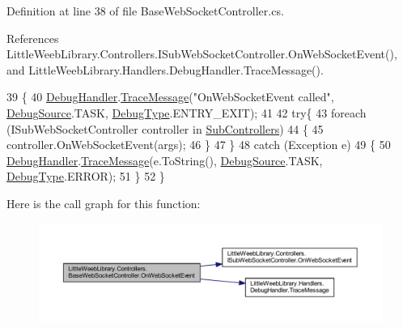 Definition at line 38 of file Base\+Web\+Socket\+Controller.\+cs.



References Little\+Weeb\+Library.\+Controllers.\+I\+Sub\+Web\+Socket\+Controller.\+On\+Web\+Socket\+Event(), and Little\+Weeb\+Library.\+Handlers.\+Debug\+Handler.\+Trace\+Message().


\begin{DoxyCode}
39         \{
40             \mbox{\hyperlink{class_little_weeb_library_1_1_handlers_1_1_debug_handler}{DebugHandler}}.\mbox{\hyperlink{class_little_weeb_library_1_1_handlers_1_1_debug_handler_afccb37dfd6b2114af72000c2f4fe4607}{TraceMessage}}(\textcolor{stringliteral}{"OnWebSocketEvent called"}, 
      \mbox{\hyperlink{namespace_little_weeb_library_1_1_handlers_a2a6ca0775121c9c503d58aa254d292be}{DebugSource}}.TASK, \mbox{\hyperlink{namespace_little_weeb_library_1_1_handlers_ab66019ed40462876ec4e61bb3ccb0a62}{DebugType}}.ENTRY\_EXIT);
41 
42             \textcolor{keywordflow}{try}\{
43                 \textcolor{keywordflow}{foreach} (ISubWebSocketController controller \textcolor{keywordflow}{in} \mbox{\hyperlink{class_little_weeb_library_1_1_controllers_1_1_base_web_socket_controller_a73de333945e3c5cbba6976077e62d61c}{SubControllers}})
44                 \{
45                     controller.OnWebSocketEvent(args);
46                 \}
47             \}
48             \textcolor{keywordflow}{catch} (Exception e)
49             \{
50                 \mbox{\hyperlink{class_little_weeb_library_1_1_handlers_1_1_debug_handler}{DebugHandler}}.\mbox{\hyperlink{class_little_weeb_library_1_1_handlers_1_1_debug_handler_afccb37dfd6b2114af72000c2f4fe4607}{TraceMessage}}(e.ToString(), 
      \mbox{\hyperlink{namespace_little_weeb_library_1_1_handlers_a2a6ca0775121c9c503d58aa254d292be}{DebugSource}}.TASK, \mbox{\hyperlink{namespace_little_weeb_library_1_1_handlers_ab66019ed40462876ec4e61bb3ccb0a62}{DebugType}}.ERROR);
51             \}
52         \}
\end{DoxyCode}
Here is the call graph for this function\+:\nopagebreak
\begin{figure}[H]
\begin{center}
\leavevmode
\includegraphics[width=350pt]{class_little_weeb_library_1_1_controllers_1_1_base_web_socket_controller_a5344934da2b25a2ec1599b2ec86dd06e_cgraph}
\end{center}
\end{figure}


